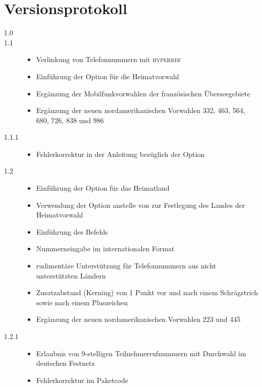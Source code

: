 \documentclass[numbers=noenddot]{scrreprt}
\newcommand*\Paket[1]{\textsc{#1}}
\begin{document}
\chapter{Versionsprotokoll}
\small
\begin{description}
\item[1.0] 
\item[1.1] 
\begin{itemize}
\item Verlinkung von Telefonnummern mit \Paket{hyperref}
\item Einführung der Option  für die Heimatvorwahl
\item Ergänzung der Mobilfunkvorwahlen der französischen Überseegebiete
\item Ergänzung der neuen nordamerikanischen Vorwahlen 332, 463, 564, 680, 726, 838 und 986
\end{itemize}
\item[1.1.1] 
\begin{itemize}
\item Fehlerkorrektur in der Anleitung bezüglich der Option 
\end{itemize}
\item[1.2] 
\begin{itemize}
\item Einführung der Option
für das Heimatland
\item Verwendung der Option
anstelle von
zur Festlegung des Landes der Heimatvorwahl
\item Einführung des Befehls
\item Nummerneingabe im internationalen Format
\item rudimentäre Unterstützung für Telefonnummern aus nicht unterstützten Ländern
\item Zusatzabstand (Kerning) von 1 Punkt vor und nach einem Schrägstrich sowie nach einem Pluszeichen
\item Ergänzung der neuen nordamerikanischen Vorwahlen 223 und 445
\end{itemize}
\item[1.2.1] 
\begin{itemize}
\item Erlaubnis von 9-stelligen Teilnehmerrufnummern mit Durchwahl im deutschen Festnetz
\item Fehlerkorrektur im Paketcode

\end{itemize}
\end{description}
\end{document}

